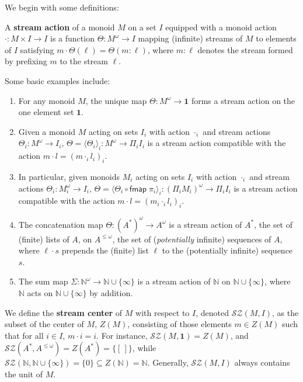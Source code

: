 \documentclass[acmsmall,screen,review]{acmart}
\newcommand{\mc}[1]{\ensuremath{\mathcal{#1}}}
\newcommand{\ms}[1]{\ensuremath{\mathsf{#1}}}
\newcommand{\nats}{\mathbb{N}}
\begin{document}
We begin with some definitions:
\begin{definition}
  A \textbf{stream action} of a monoid \(M\) on a set \(I\) equipped with a
  monoid action \(\cdot: M \times I \to I\) is a function \(\Theta: M^\omega \to
  I\) mapping (infinite) streams of \(M\) to elements of \(I\) satisfying
  \(
    m \cdot \Theta(\ell) = \Theta(m \colon \ell)
  \),
  where \(m \colon \ell\) denotes the stream formed by prefixing \(m\) to the
  stream \(\ell\).
\end{definition}
Some basic examples include:
\begin{enumerate}
  \item For any monoid \(M\), the unique map \(\Theta: M^\omega \to \mathbf{1}\) forms a stream action on the one element set \(\mathbf{1}\).
  \item Given a monoid \(M\) acting on sets \(I_i\) with action \(\cdot_i\) and stream actions \(\Theta_i: M^\omega \to I_i\), \(\Theta = \langle\Theta_i\rangle_i: M^\omega \to \Pi_iI_i\) is a stream action compatible with the action \(m \cdot l = (m \cdot_i l_i)_i\).
  \item In particular, given monoids \(M_i\) acting on sets \(I_i\) with action \(\cdot_i\) and stream actions \(\Theta_i: M_i^\omega \to I_i\), \(\Theta = \langle \Theta_i \circ \ms{fmap}\;\pi_i\rangle_i: (\Pi_iM_i)^\omega \to \Pi_iI_i\) is a stream action compatible with the action \(m \cdot l = (m_i \cdot_i l_i)_i\).
  \item The concatenation map \(\Theta: (A^*)^\omega \to A^\omega\) is a stream action of \(A^*\), the set of (finite) lists of \(A\), on \(A^{\leq \omega}\), the set of (\textit{potentially} infinite) sequences of \(A\), where \(\ell \cdot s\) prepends the (finite) list \(\ell\) to the (potentially infinite) sequence \(s\).
  \item The sum map \(\Sigma: \nats^\omega \to \nats \cup \{\infty\}\) is a stream action of \(\nats\) on \(\nats \cup \{\infty\}\), where \(\nats\) acts on \(\nats \cup \{\infty\}\) by addition.
\end{enumerate}
We define the \textbf{stream center} of \(M\) with respect to \(I\), denoted
\(\mc{SZ}(M, I)\), as the subset of the center of \(M\), \(Z(M)\), consisting of
those elements \(m \in Z(M)\) such that for all \(i \in I\), \(m \cdot i = i\).
For instance, \(\mc{SZ}(M, \mathbf{1}) = Z(M)\), and \(\mc{SZ}(A^*, A^{\leq
\omega}) = Z(A^*) = \{[\,]\}\), while \(\mc{SZ}(\nats, \nats \cup \{\infty\}) =
\{0\} \subseteq Z(\nats) = \nats\). Generally, \(\mc{SZ}(M, I)\) always contains
the unit of \(M\).
\end{document}
